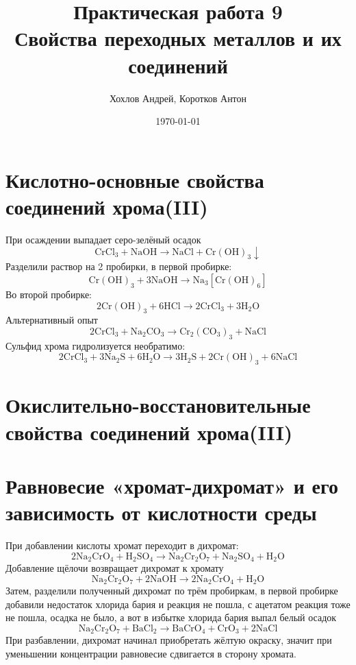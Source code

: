 \documentclass[a4paper,12pt]{article}
\author{Хохлов Андрей, Коротков Антон}
\title{Практическая работа 9 \\
	\textbf{Свойства переходных металлов и их соединений}}
\date{\today}
\begin{document}
{\Large \maketitle}
\section{Кислотно-основные свойства соединений хрома(III)}
При осаждении выпадает серо-зелёный осадок
\begin{equation} 
\mathrm{CrCl_3 + NaOH \longrightarrow NaCl + Cr(OH)_3 \downarrow } 
\end{equation}
Разделили раствор на 2 пробирки, в первой пробирке:
\begin{equation} 
\mathrm{Cr(OH)_3 + 3NaOH \longrightarrow Na_3[Cr(OH)_6]  } 
\end{equation}
Во второй пробирке:
\begin{equation} 
\mathrm{2Cr(OH)_3 + 6HCl \longrightarrow  2CrCl_3 + 3H_2O}
\end{equation}
Альтернативный опыт
\begin{equation} 
\mathrm{2CrCl_3 + Na_2CO_3 \longrightarrow Cr_2(CO_3)_3+NaCl}
\end{equation}
Сульфид хрома гидролизуется необратимо:
\begin{equation} 
\mathrm{2CrCl_3 + 3Na_2S + 6H_2O \longrightarrow 3H_2S + 2Cr(OH)_3 + 6NaCl }
\end{equation}
\section{Окислительно-восстановительные свойства соединений хрома(III)} 
\section{Равновесие «хромат-дихромат» и его зависимость от кислотности среды}
При добавлении кислоты хромат переходит в дихромат:
\begin{equation} 
\mathrm{2Na_2CrO_4 + H_2SO_4 \longrightarrow Na_2Cr_2O_7 + Na_2SO_4+H_2O }
\end{equation}
Добавление щёлочи возвращает дихромат к хромату
\begin{equation} 
\mathrm{Na_2Cr_2O_7 + 2NaOH \longrightarrow 2Na_2CrO_4 +H_2O }
\end{equation}
Затем, разделили полученный дихромат по трём пробиркам, в первой пробирке добавили недостаток хлорида бария и реакция не пошла, с ацетатом реакция тоже не пошла, осадка не было, а вот в избытке хлорида бария выпал белый осадок
\begin{equation} 
\mathrm{Na_2Cr_2O_7 + BaCl_2 \longrightarrow BaCrO_4 + CrO_3 + 2NaCl}
\end{equation}
При разбавлении, дихромат начинал приобретать жёлтую окраску, значит при уменьшении концентрации равновесие сдвигается в сторону хромата.
\end{document}
